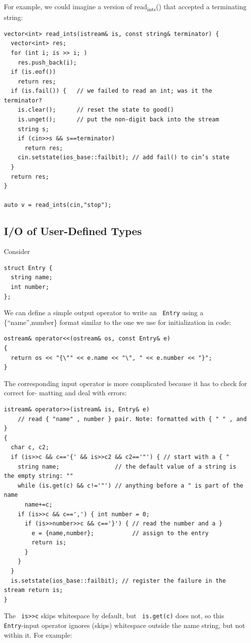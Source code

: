 \documentclass[11pt]{article}
\let\OldTexttt\texttt
\renewcommand{\texttt}[1]{\OldTexttt{\color{MidnightBlue} #1}}
\begin{document}
For example, we could imagine a version of read\textsubscript{ints}() that accepted a terminating string:
\begin{verbatim}
vector<int> read_ints(istream& is, const string& terminator) {
  vector<int> res;
  for (int i; is >> i; )
    res.push_back(i);
  if (is.eof())
    return res;
  if (is.fail()) {   // we failed to read an int; was it the terminator?
    is.clear();      // reset the state to good()
    is.unget();      // put the non-digit back into the stream
    string s;
    if (cin>>s && s==terminator)
      return res;
    cin.setstate(ios_base::failbit); // add fail() to cin’s state
  }
  return res;
}

auto v = read_ints(cin,"stop");
\end{verbatim}
\subsection{I/O of User-Defined Types}
\label{sec:org947277e}
Consider
\begin{verbatim}
struct Entry {
  string name;
  int number;
};
\end{verbatim}
We can define a simple output operator to write an \texttt{Entry} using a \{``name'',number\} format similar
to the one we use for initialization in code:
\begin{verbatim}
ostream& operator<<(ostream& os, const Entry& e)
{
  return os << "{\"" << e.name << "\", " << e.number << "}";
}
\end{verbatim}

The corresponding input operator is more complicated because it has to check for correct for-
matting and deal with errors:
\begin{verbatim}
istream& operator>>(istream& is, Entry& e)
    // read { "name" , number } pair. Note: formatted with { " " , and }
{
  char c, c2;
  if (is>>c && c=='{' && is>>c2 && c2=='"') { // start with a { "
    string name;                // the default value of a string is the empty string: ""
    while (is.get(c) && c!='"') // anything before a " is part of the name
      name+=c;
    if (is>>c && c==',') { int number = 0;
      if (is>>number>>c && c=='}') { // read the number and a }
        e = {name,number};           // assign to the entry
        return is;
      }
    }
  }
  is.setstate(ios_base::failbit); // register the failure in the stream return is;
}
\end{verbatim}

The \texttt{is>>c} skips whitespace by default, but \texttt{is.get(c)} does not, so this \texttt{Entry}-input operator
ignores (skips) whitespace outside the name string, but not within it. For example:
\end{document}
